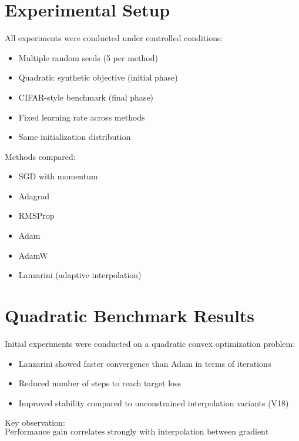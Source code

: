 \documentclass{article}
\begin{document}
\section{Experimental Setup}

All experiments were conducted under controlled conditions:

\begin{itemize}
    \item Multiple random seeds (5 per method)
    \item Quadratic synthetic objective (initial phase)
    \item CIFAR-style benchmark (final phase)
    \item Fixed learning rate across methods
    \item Same initialization distribution
\end{itemize}

Methods compared:

\begin{itemize}
    \item SGD with momentum
    \item Adagrad
    \item RMSProp
    \item Adam
    \item AdamW
    \item Lanzarini (adaptive interpolation)
\end{itemize}

\section{Quadratic Benchmark Results}

Initial experiments were conducted on a quadratic convex optimization problem:

\begin{itemize}
    \item Lanzarini showed faster convergence than Adam in terms of iterations
    \item Reduced number of steps to reach target loss
    \item Improved stability compared to unconstrained interpolation variants (V18)
\end{itemize}

Key observation:
\begin{equation}
\text{Performance gain correlates strongly with interpolation between gradient directions}
\end{equation}
\end{document}
